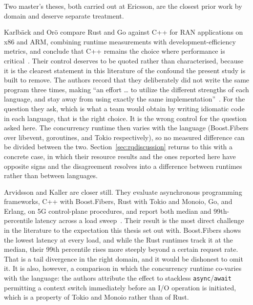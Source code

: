 \documentclass[english,twoside,openright,a4paper,censored,csm,software-track-2020]{HYthesisML}
\begin{document}
Two master's theses, both carried out at Ericsson, are the closest prior work by domain and
deserve separate treatment.

Karlb\"ack and Or\"o compare Rust and Go against C++ for RAN applications on x86 and ARM,
combining runtime measurements with development-efficiency metrics, and conclude that C++ remains
the choice where performance is critical~\cite{karlback2021ran}. Their control deserves to be
quoted rather than characterised, because it is the clearest statement in this literature of the
confound the present study is built to remove. The authors record that they deliberately did not
write the same program three times, making ``an effort \ldots{} to utilize the different
strengths of each language, and stay away from using exactly the same
implementation''~\cite{karlback2021ran}. For the question they ask, which is what a team would
obtain by writing idiomatic code in each language, that is the right choice. It is the wrong
control for the question asked here. The concurrency runtime then varies with the language
(Boost.Fibers over libevent, goroutines, and Tokio respectively), so no measured difference can
be divided between the two. Section~\ref{sec:rqdiscussion} returns to this with a concrete
case, in which their resource results and the ones reported here have opposite signs and the
disagreement resolves into a difference between runtimes rather than between languages.

Arvidsson and Kaller are closer still. They evaluate asynchronous programming frameworks, C++
with Boost.Fibers, Rust with Tokio and Monoio, Go, and Erlang, on 5G control-plane procedures,
and report both median and 99th-percentile latency across a load
sweep~\cite{arvidsson2025async}. Their result is the most direct challenge in the literature to
the expectation this thesis set out with. Boost.Fibers shows the lowest latency at every load,
and while the Rust runtimes track it at the median, their 99th percentile rises more steeply
beyond a certain request rate. That is a tail divergence in the right domain, and it would be
dishonest to omit it. It is also, however, a comparison in which the concurrency runtime
co-varies with the language: the authors attribute the effect to stackless
\texttt{async}/\texttt{await} permitting a context switch immediately before an I/O operation is
initiated, which is a property of Tokio and Monoio rather than of Rust.
\end{document}
